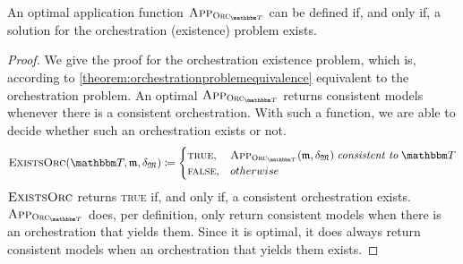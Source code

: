 \begin{theorem}
    \label{theorem:optimal_application_function_orchestration_problem}
    An optimal application function $\appfunction{\orcfunction{\transformationset{T}}}$ can be defined if, and only if, a solution for the orchestration (existence) problem exists.
\end{theorem}
\begin{proof}
    We give the proof for the orchestration existence problem, which is, according to \autoref{theorem:orchestrationproblemequivalence} equivalent to the orchestration problem.
    An optimal $\appfunction{\orcfunction{\transformationset{T}}}$ returns consistent models whenever there is a consistent orchestration.
    With such a function, we are able to decide whether such an orchestration exists or not.
    \begin{align*}
        \function{ExistsOrc}(\transformationset{T},\modeltuple{m},\changetuple{\metamodeltuple{M}}) \equalsperdefinition
            \begin{cases}
                \textsc{true}, & \appfunction{\orcfunction{\transformationset{T}}}(\modeltuple{m},\changetuple{\metamodeltuple{M}}) \consistenttomath \transformationset{T} \\
                \textsc{false}, & otherwise
            \end{cases}
    \end{align*}
    $\textsc{ExistsOrc}$ returns \textsc{true} if, and only if, a consistent orchestration exists.
    $\appfunction{\orcfunction{\transformationset{T}}}$ does, per definition, only return consistent models when there is an orchestration that yields them.
    Since it is optimal, it does always return consistent models when an orchestration that yields them exists.
\end{proof}

